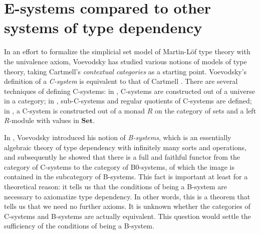 \begin{comment}
\section{Weak E-systems}

\begin{rmk}
Note that $W$ is a strict $2$-functor frm $\cat{F}$ to $\mathbb{Cat}$ of which
the value at an object $\Gamma$ is specified to be $\cat{F}/\Gamma$, and which
is required to preserve the final object. We could have considered $W$ to be a 
pseudo-functor from $\cat{F}$ to $\mathbb{Cat}$ instead. A coherence theorem
by Power \cite{Power89} then allows for the strictification of this pseudo-functor
into a (strict) weakening structure. (Does this map $\Gamma$ to $\cat{F}/\Gamma$
and final to final?). Thus, we know what a weak pre-weakening system has to be.
The following questions need to be answered:
\begin{itemize}
\item What is a weak weakening/projection/substitution system.
\item What is a weak E-system? I.e.~what are the coherence rules for something
to be a weakening/projection/substitution homomorphism?
\item Can they all be strictified? Are there more examples of weak E-systems?
\end{itemize}
\end{rmk}
\end{comment}

\section{E-systems compared to other systems of type dependency}\label{sec:esys_compared}
In an effort to formalize the simplicial set model of Martin-L\"of type theory
with the univalence axiom, Voevodsky has studied various notions of models of
type theory, taking Cartmell's \emph{contextual categories} as a starting
point. Voevodsky's definition of a \emph{C-system} is equivalent to that of Cartmell
\cite{VV_C-systems_quotients}. There are several techniques of defining 
C-systems: in \cite{VV_Csys_univ}, C-systems are constructed out of a universe
in a category; in \cite{VV_C-systems_quotients}, sub-C-systems and regular
quotients of C-systems are defined; in \cite{VV_C-systems_monad}, a C-system
is constructed out of a monad $R$ on the category of sets and a left $R$-module
with values in $\mathbf{Set}$. 

In \cite{VV_B-systems}, Voevodsky introduced his notion of \emph{B-systems}, which is
an essentially algebraic theory of type dependency with infinitely many sorts 
and operations, and subsequently he showed that there is a full and faithful
functor from the category of C-systems to the category of B0-systems, of which
the image is contained in the subcategory of B-systems. This fact is important at least
for a theoretical reason: it tells us that the conditions of being a B-system
are necessary to axiomatize type dependency. In other words,
this is a theorem that tells us that we need no further axioms. It is
unknown whether the categories of C-systems and B-systems are actually equivalent.
This question would settle the sufficiency of the conditions of being a B-system.

